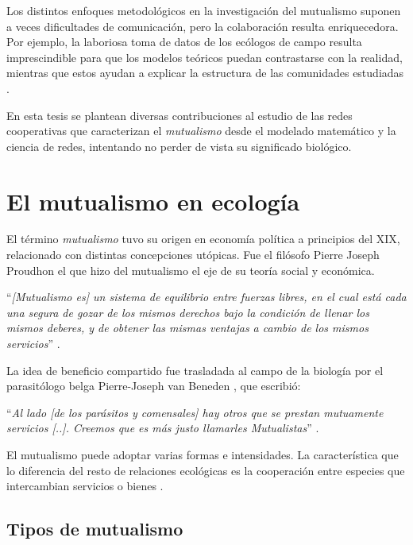 Los distintos enfoques metodológicos en la investigación del mutualismo suponen a veces dificultades de comunicación, pero la colaboración resulta enriquecedora. Por ejemplo, la laboriosa toma de datos de los ecólogos de campo resulta imprescindible para que los modelos teóricos puedan contrastarse con la realidad, mientras que estos ayudan a explicar la estructura de las comunidades estudiadas \cite{ballantyne2015constructing}.

En esta tesis se plantean diversas contribuciones al estudio de las redes cooperativas que  caracterizan el \textit{mutualismo} desde el modelado matemático y la ciencia de redes, intentando no perder de vista su significado biológico.

\section{El mutualismo en ecología}

El término \textit{mutualismo} tuvo su origen en economía política a principios del XIX, relacionado con distintas concepciones utópicas. Fue el filósofo Pierre Joseph Proudhon el que hizo del mutualismo el eje de su teoría social y económica.

\enquote{\itshape [Mutualismo es] un sistema de equilibrio entre fuerzas libres, en el cual está cada una segura de gozar de los mismos derechos bajo la condición de llenar los mismos deberes, y 
de obtener las mismas ventajas a cambio de los mismos servicios} \cite{proudhon1868capacite}.

La idea de beneficio compartido fue trasladada al campo de la biología por el parasitólogo belga Pierre-Joseph van Beneden \cite{boucher1982ecology}, que escribió:

\enquote{\itshape Al lado [de los parásitos y comensales] hay otros que se prestan mutuamente servicios [..]. Creemos que es más justo llamarles Mutualistas} \cite{van1878commensaux}.

El mutualismo puede adoptar varias formas e intensidades. La característica que lo diferencia del resto de relaciones ecológicas es la cooperación entre especies que intercambian servicios o bienes \cite{bronstein2001exploitation}.


\subsection{Tipos de mutualismo}
\label{TIPOS_DE_MUTUALISMO}
	
